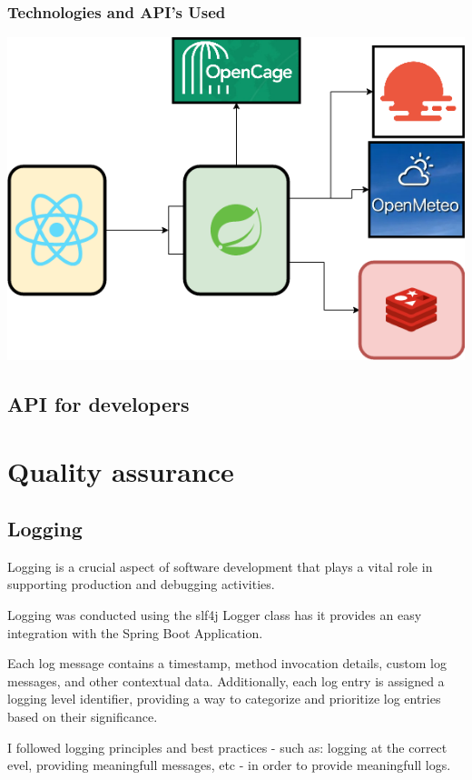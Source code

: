 \documentclass[12pt]{article}
\begin{document}
\subsubsection{Technologies and API's Used}

\includegraphics[scale=.4]{TechFrameworks.png}

\subsection{API for developers}

\section{Quality assurance}

\subsection{Logging}

Logging is a crucial aspect of software development that plays a vital role in supporting production and debugging activities. 

Logging was conducted using the slf4j Logger class has it provides an easy integration with the Spring Boot Application.

Each log message contains a timestamp, method invocation details, custom log messages, and other contextual data. Additionally, each log entry is assigned a logging level identifier, providing a way to categorize and prioritize log entries based on their significance.

I followed logging principles and best practices - such as: logging at the correct evel, providing meaningfull messages, etc - in order to provide meaningfull logs.
\end{document}
